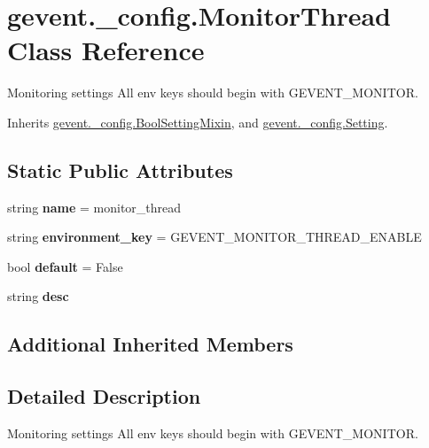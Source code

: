 \hypertarget{classgevent_1_1__config_1_1_monitor_thread}{}\section{gevent.\+\_\+config.\+Monitor\+Thread Class Reference}
\label{classgevent_1_1__config_1_1_monitor_thread}


Monitoring settings All env keys should begin with G\+E\+V\+E\+N\+T\+\_\+\+M\+O\+N\+I\+T\+OR.  




Inherits \hyperlink{classgevent_1_1__config_1_1_bool_setting_mixin}{gevent.\+\_\+config.\+Bool\+Setting\+Mixin}, and \hyperlink{classgevent_1_1__config_1_1_setting}{gevent.\+\_\+config.\+Setting}.

\subsection*{Static Public Attributes}
\begin{DoxyCompactItemize}
\item 
\mbox{\label{classgevent_1_1__config_1_1_monitor_thread_a38e2b9959be73dc7d9ef24a0fcf628bb}} 
string {\bfseries name} = \textquotesingle{}monitor\+\_\+thread\textquotesingle{}
\item 
\mbox{\label{classgevent_1_1__config_1_1_monitor_thread_a56b61477490b09f5866cd39a4d36ad03}} 
string {\bfseries environment\+\_\+key} = \textquotesingle{}G\+E\+V\+E\+N\+T\+\_\+\+M\+O\+N\+I\+T\+O\+R\+\_\+\+T\+H\+R\+E\+A\+D\+\_\+\+E\+N\+A\+B\+LE\textquotesingle{}
\item 
\mbox{\label{classgevent_1_1__config_1_1_monitor_thread_ac47d796fa756e065906e59c1c36be0a0}} 
bool {\bfseries default} = False
\item 
string {\bfseries desc}
\end{DoxyCompactItemize}
\subsection*{Additional Inherited Members}


\subsection{Detailed Description}
Monitoring settings All env keys should begin with G\+E\+V\+E\+N\+T\+\_\+\+M\+O\+N\+I\+T\+OR. 

